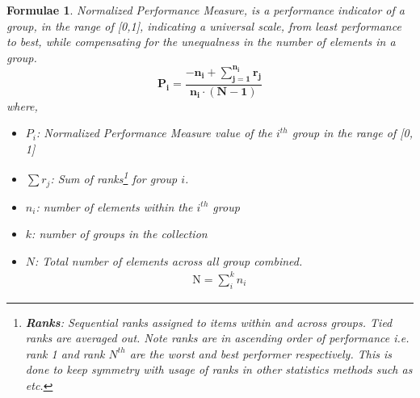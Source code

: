 \documentclass[a4paper,fleqn,review]{cas-sc}
\newtheorem{theorem}{Formulae}
\begin{document}
\begin{theorem}\label{def:normalized-performance-measure}
	Normalized Performance Measure, is a performance indicator of a group, in the range of [0,1], indicating a universal scale, from least performance to best, while compensating for the unequalness in the number of elements in a group.
	\begin{equation}
		\boxed{
			\mathbf{
				P_i = \frac{-n_i +  \sum\limits_{j=1}^{n_i} r_j}{n_i \cdot (N - 1)}}
		}
	\label{eq:normalized-performance-measure}	
	\end{equation}
where,
\begin{itemize}
	\item \textbf{$P_i$}: Normalized Performance Measure value of the $i^{th}$ group in the range of [0, 1]
	\item \textbf{$\sum r_j$}: Sum of ranks\footnote{{\textbf{Ranks}: Sequential ranks assigned to items within and across groups. Tied ranks are averaged out. Note ranks are in ascending order of performance i.e. rank 1 and rank $N^{th}$ are the worst and best performer respectively. This is done to keep symmetry with usage of ranks in other statistics methods such as \cite{mann1947test} etc.}} for group $i$.
	\item \textbf{$n_i$}: number of elements within the $i^{th}$ group
	\item \textbf{$k$}: number of groups in the collection
	\item \textbf{$N$}: Total number of elements across all group combined.
	\begin{align*}
		\text{N} = \sum\limits_i^k n_i
	\end{align*}
\end{itemize}

\end{theorem}
\end{document}
